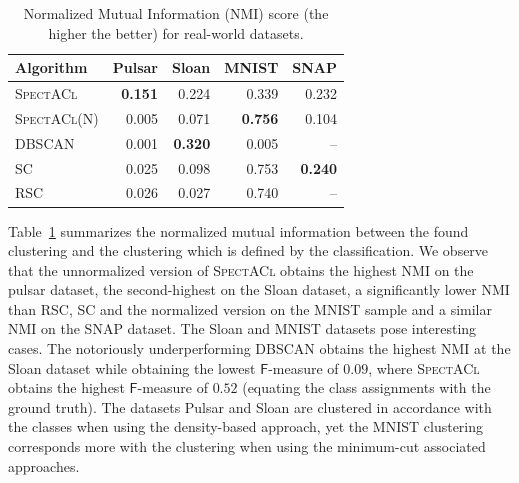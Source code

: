 \begin{table}%
	\centering
	\begin{tabular}{lrrrr}\toprule
	Algorithm & Pulsar & Sloan & MNIST & SNAP  \\\midrule
    \textsc{SpectACl} &	\textbf{0.151} & 0.224 & 0.339 & 0.232\\
    \textsc{SpectACl}(N) & 0.005 & 0.071 & \textbf{0.756} & 0.104\\
    DBSCAN & 0.001 & \textbf{0.320} & 0.005 & --\\
    \textsc{SC} & 0.025 & 0.098 & 0.753 & \textbf{0.240}\\
    \textsc{RSC} & 0.026 & 0.027 &0.740 & --\\ \bottomrule
    \end{tabular}
\caption{Normalized Mutual Information (NMI) score (the higher the better) for real-world datasets.}
\label{tbl:realNMI}
\end{table}
Table~\ref{tbl:realNMI} summarizes the normalized mutual information between the found clustering and the clustering which is defined by the classification. We observe that the unnormalized version of \textsc{SpectACl} obtains the highest NMI on the pulsar dataset, the second-highest on the Sloan dataset, a significantly lower NMI than \textsc{RSC}, \textsc{SC} and the normalized version on the MNIST sample and a similar NMI on the SNAP dataset. The Sloan and MNIST datasets pose interesting cases. The notoriously underperforming DBSCAN obtains the highest NMI at the Sloan dataset while obtaining the lowest $\mathsf{F}$-measure of $0.09$, where \textsc{SpectACl} obtains the highest $\mathsf{F}$-measure of $0.52$ (equating the class assignments with the ground truth). The datasets Pulsar and Sloan are clustered in accordance with the classes when using the density-based approach, yet the MNIST clustering corresponds more with the clustering when using the minimum-cut associated approaches.

